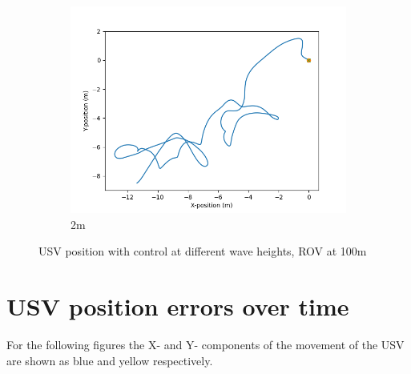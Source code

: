 \documentclass[class=article, crop=false]{standalone}
\begin{document}
\begin{figure}
\begin{subfigure}[b]{0.48\textwidth}
        \includegraphics{scenario1/rov-100m/2.0m/usv_position_controlled}
        \caption{2m}
        \label{}
    \end{subfigure}

    \caption{USV position with control at different wave heights, ROV at 100m}
\end{figure}
\FloatBarrier
\section{USV position errors over time}
For the following figures the X- and Y- components of the movement of the USV are shown as blue and yellow respectively.
\end{document}
